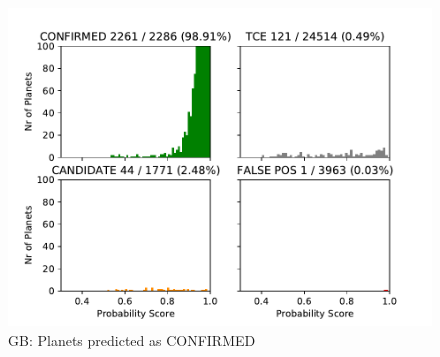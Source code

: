 
\begin{figure}[H]
                \begin{mdframed}[linecolor=green]
                \centering
                \includegraphics[width = 1\textwidth,height=.4\textheight]{data/GB_pred_confirm.pdf}
                \caption{GB: Planets predicted as CONFIRMED}
                \label{fig:data/GB_pred_confirm}
                \end{mdframed}
                \end{figure}